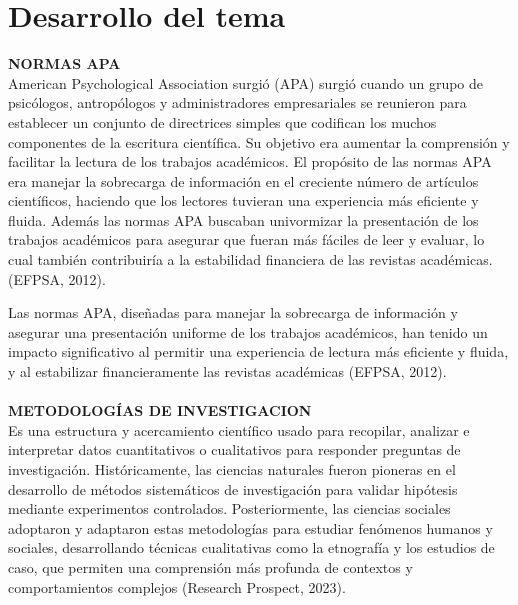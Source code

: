 \documentclass[12pt]{article}
\begin{document}
\section{Desarrollo del tema}
    \textbf{NORMAS APA} \\ 
        American Psychological Association surgió (APA) surgió cuando un grupo de psicólogos, antropólogos y administradores empresariales se reunieron para establecer un conjunto de directrices simples que codifican los muchos componentes de la escritura científica. Su objetivo era aumentar la comprensión y facilitar la lectura de los trabajos académicos. El propósito de las normas APA era manejar la sobrecarga de información en el creciente número de artículos científicos, haciendo que los lectores tuvieran una experiencia más eficiente y fluida. Además las normas APA buscaban univormizar la presentación de los trabajos académicos para asegurar que fueran más fáciles de leer y evaluar, lo cual también contribuiría a la estabilidad financiera de las revistas académicas. (EFPSA, 2012).

        Las normas APA, diseñadas para manejar la sobrecarga de información y asegurar una presentación uniforme de los trabajos académicos, han tenido un impacto significativo al permitir una experiencia de lectura más eficiente y fluida, y al estabilizar financieramente las revistas académicas (EFPSA, 2012). \\ 
    \\ \textbf{METODOLOGÍAS DE INVESTIGACION} \\ 
        Es una estructura y acercamiento científico usado para recopilar, analizar e interpretar datos cuantitativos o cualitativos para responder preguntas de investigación. Históricamente, las ciencias naturales fueron pioneras en el desarrollo de métodos sistemáticos de investigación para validar hipótesis mediante experimentos controlados. Posteriormente, las ciencias sociales adoptaron y adaptaron estas metodologías para estudiar fenómenos humanos y sociales, desarrollando técnicas cualitativas como la etnografía y los estudios de caso, que permiten una comprensión más profunda de contextos y comportamientos complejos (Research Prospect, 2023).
\end{document}
